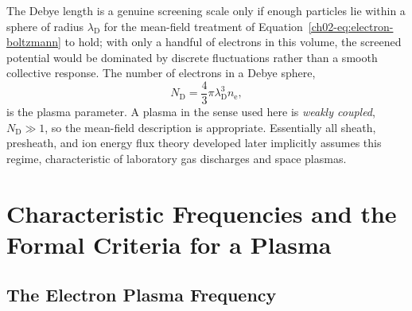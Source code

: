 The Debye length is a genuine screening scale only if enough particles lie within a sphere of radius $\lambda_{\mathrm{D}}$ for the mean-field treatment of Equation~\eqref{ch02-eq:electron-boltzmann} to hold; with only a handful of electrons in this volume, the screened potential would be dominated by discrete fluctuations rather than a smooth collective response. The number of electrons in a Debye sphere,
\begin{equation}
N_{\mathrm{D}} = \frac{4}{3}\pi \lambda_{\mathrm{D}}^{3} n_{\mathrm{e}},
\label{eq:debye-number}
\end{equation}
is the plasma parameter. A plasma in the sense used here is \emph{weakly coupled}, $N_{\mathrm{D}} \gg 1$, so the mean-field description is appropriate. Essentially all sheath, presheath, and ion energy flux theory developed later implicitly assumes this regime, characteristic of laboratory gas discharges and space plasmas.

\section{Characteristic Frequencies and the Formal Criteria for a Plasma}
\label{sec:frequencies}

\subsection{The Electron Plasma Frequency}

